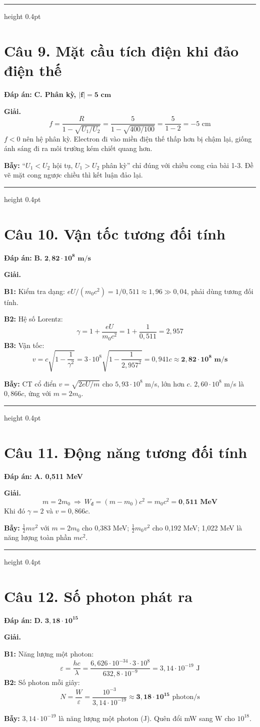 \documentclass[11pt,a4paper]{article}
\renewcommand{\boldsymbol}[1]{\symbf{#1}}
\newcommand{\Wd}{W_{\text{đ}}}
\newcommand{\Cau}[2]{\par\Needspace{7\baselineskip}\section*{Câu #1. #2}}
\newcommand{\DapAn}[1]{\textbf{Đáp án:} #1\par}
\newcommand{\Bay}[1]{\par\textbf{Bẫy:} #1\par}
\newcommand{\PhanCachBai}{%
  \par\Needspace{7\baselineskip}%
  \addvspace{6pt}%
  {\color{black!40}\hrule height 0.4pt}%
  \nobreak\vspace{7pt}\nobreak
}
\begin{document}
\PhanCachBai
\Cau{9}{Mặt cầu tích điện khi đảo điện thế}
\DapAn{\textbf{C. Phân kỳ, $\boldsymbol{|f|=5\text{ cm}}$}}

\textbf{Giải.}
\begin{equation*}
    f=\frac{R}{1-\sqrt{U_1/U_2}}=\frac{5}{1-\sqrt{400/100}}=\frac{5}{1-2}=-5\text{ cm}
\end{equation*}
$f<0$ nên hệ phân kỳ. Electron đi vào miền điện thế thấp hơn bị chậm lại, giống ánh sáng đi ra môi trường kém chiết quang hơn.
\Bay{``$U_1<U_2$ hội tụ, $U_1>U_2$ phân kỳ'' chỉ đúng với chiều cong của bài 1-3. Đề vẽ mặt cong ngược chiều thì kết luận đảo lại.}

\PhanCachBai
\Cau{10}{Vận tốc tương đối tính}
\DapAn{\textbf{B.} $\boldsymbol{2{,}82\cdot10^{8}\text{ m/s}}$}

\textbf{Giải.}

\textbf{B1:} Kiểm tra dạng: $eU/(m_0c^2)=1/0{,}511\approx1{,}96\gg0{,}04$, phải dùng tương đối tính.

\textbf{B2:} Hệ số Lorentz:
\begin{equation*}
    \gamma=1+\frac{eU}{m_0c^2}=1+\frac{1}{0{,}511}=2{,}957
\end{equation*}
\textbf{B3:} Vận tốc:
\begin{equation*}
    v=c\sqrt{1-\frac1{\gamma^2}}=3\cdot10^{8}\sqrt{1-\frac{1}{2{,}957^2}}=0{,}941c\approx\boldsymbol{2{,}82\cdot10^{8}\text{ m/s}}
\end{equation*}
\Bay{CT cổ điển $v=\sqrt{2eU/m}$ cho $5{,}93\cdot10^{8}$ m/s, lớn hơn $c$. $2{,}60\cdot10^{8}$ m/s là $0{,}866c$, ứng với $m=2m_0$.}

\PhanCachBai
\Cau{11}{Động năng tương đối tính}
\DapAn{\textbf{A. 0,511 MeV}}

\textbf{Giải.}
\begin{equation*}
    m=2m_0\ \Longrightarrow\ \Wd=(m-m_0)c^2=m_0c^2=\boldsymbol{0{,}511\text{ MeV}}
\end{equation*}
Khi đó $\gamma=2$ và $v=0{,}866c$.
\Bay{$\frac12mv^2$ với $m=2m_0$ cho 0,383 MeV; $\frac12m_0v^2$ cho 0,192 MeV; 1,022 MeV là năng lượng toàn phần $mc^2$.}

\PhanCachBai
\Cau{12}{Số photon phát ra}
\DapAn{\textbf{D.} $\boldsymbol{3{,}18\cdot10^{15}}$}

\textbf{Giải.}

\textbf{B1:} Năng lượng một photon:
\begin{equation*}
    \varepsilon=\frac{hc}{\lambda}=\frac{6{,}626\cdot10^{-34}\cdot3\cdot10^{8}}{632{,}8\cdot10^{-9}}=3{,}14\cdot10^{-19}\text{ J}
\end{equation*}
\textbf{B2:} Số photon mỗi giây:
\begin{equation*}
    N=\frac{W}{\varepsilon}=\frac{10^{-3}}{3{,}14\cdot10^{-19}}\approx\boldsymbol{3{,}18\cdot10^{15}}\text{ photon/s}
\end{equation*}
\Bay{$3{,}14\cdot10^{-19}$ là năng lượng một photon (J). Quên đổi mW sang W cho $10^{18}$.}
\end{document}
